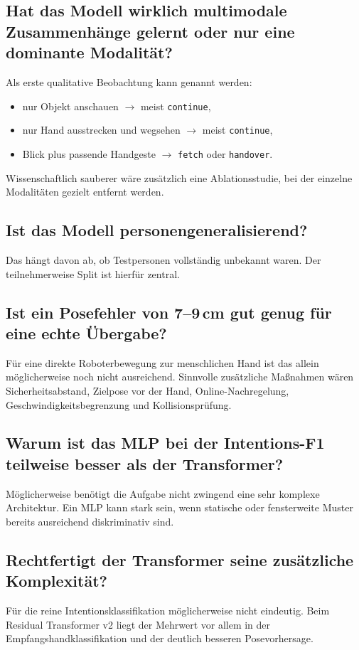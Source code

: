 \documentclass[11pt,a4paper]{article}
\begin{document}
\subsection*{Hat das Modell wirklich multimodale Zusammenhänge gelernt oder nur eine dominante Modalität?}
Als erste qualitative Beobachtung kann genannt werden:
\begin{itemize}
    \item nur Objekt anschauen $\rightarrow$ meist \texttt{continue},
    \item nur Hand ausstrecken und wegsehen $\rightarrow$ meist \texttt{continue},
    \item Blick plus passende Handgeste $\rightarrow$ \texttt{fetch} oder \texttt{handover}.
\end{itemize}
Wissenschaftlich sauberer wäre zusätzlich eine Ablationsstudie, bei der einzelne Modalitäten gezielt entfernt werden.

\subsection*{Ist das Modell personengeneralisierend?}
Das hängt davon ab, ob Testpersonen vollständig unbekannt waren. Der teilnehmerweise Split ist hierfür zentral.

\subsection*{Ist ein Posefehler von 7--9\,cm gut genug für eine echte Übergabe?}
Für eine direkte Roboterbewegung zur menschlichen Hand ist das allein möglicherweise noch nicht ausreichend. Sinnvolle zusätzliche Maßnahmen wären Sicherheitsabstand, Zielpose vor der Hand, Online-Nachregelung, Geschwindigkeitsbegrenzung und Kollisionsprüfung.

\subsection*{Warum ist das MLP bei der Intentions-F1 teilweise besser als der Transformer?}
Möglicherweise benötigt die Aufgabe nicht zwingend eine sehr komplexe Architektur. Ein MLP kann stark sein, wenn statische oder fensterweite Muster bereits ausreichend diskriminativ sind.

\subsection*{Rechtfertigt der Transformer seine zusätzliche Komplexität?}
Für die reine Intentionsklassifikation möglicherweise nicht eindeutig. Beim Residual Transformer v2 liegt der Mehrwert vor allem in der Empfangshandklassifikation und der deutlich besseren Posevorhersage.
\end{document}
